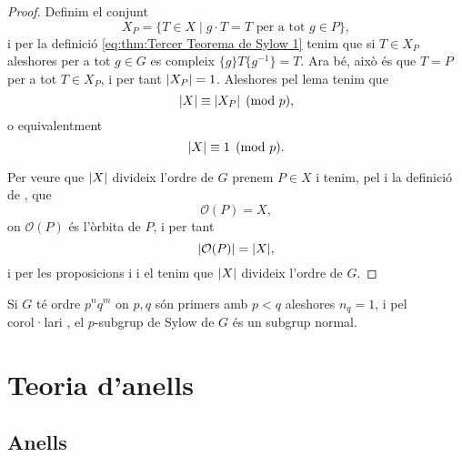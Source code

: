 \documentclass[../Apunts.tex]{subfiles}
\begin{document}
\begin{theorem}
\begin{proof}
			Definim el conjunt
			\[X_{P}=\{T\in X\mid g\cdot T=T\text{ per a tot }g\in P\},\]
			i per la definició \eqref{eq:thm:Tercer Teorema de Sylow 1} tenim que si \(T\in X_{P}\) aleshores per a tot \(g\in G\) es compleix \(\{g\}T\{g^{-1}\}=T\). Ara bé, això és que \(T=P\) per a tot \(T\in X_{P}\), i per tant \(\abs{X_{P}}=1\). Aleshores pel lema  tenim que
			\[\abs{X}\equiv\abs{X_{P}}\pmod{p},\]
			o equivalentment
			\[\abs{X}\equiv1\pmod{p}.\]
			
			Per veure que \(\abs{X}\) divideix l'ordre de \(G\) prenem \(P\in X\) i tenim, pel  i la definició de , que
			\[\mathcal{O}(P)=X,\]
			on \(\mathcal{O}(P)\) és l'òrbita de \(P\), i per tant
			\[\abs{\mathcal{O}(P)}=\abs{X},\]
			i per les proposicions  i  i el  tenim que \(\abs{X}\) divideix l'ordre de \(G\).
		\end{proof}
	\end{theorem}
	\begin{corollary}
		Si \(G\) té ordre \(p^{n}q^{m}\) on \(p,q\) són primers amb \(p<q\) aleshores \(n_{q}=1\), i pel corol·lari , el \(p\)-subgrup de Sylow de \(G\) és un subgrup normal.
	\end{corollary}
	\chapter{Teoria d'anells}
	\section{Anells}
\end{document}
